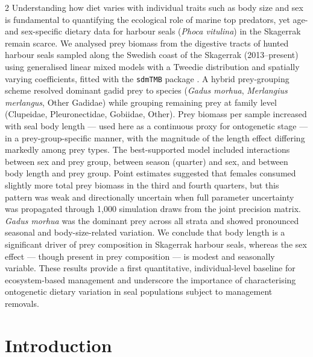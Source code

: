 \begin{spacing}{2}
Understanding how diet varies with individual traits such as body size and
sex is fundamental to quantifying the ecological role of marine top
predators, yet age- and sex-specific dietary data for harbour seals
(\textit{Phoca vitulina}) in the Skagerrak remain scarce. We analysed prey
biomass from the digestive tracts of hunted harbour seals sampled along the
Swedish coast of the Skagerrak (2013--present) using generalised linear
mixed models with a Tweedie distribution and spatially varying coefficients,
fitted with the \texttt{sdmTMB} package
\citep{Anderson2024}. A hybrid prey-grouping scheme resolved dominant gadid
prey to species (\textit{Gadus morhua}, \textit{Merlangius merlangus},
Other Gadidae) while grouping remaining prey at family level (Clupeidae,
Pleuronectidae, Gobiidae, Other). Prey biomass per sample increased with
seal body length --- used here as a continuous proxy for ontogenetic stage
--- in a prey-group-specific manner, with the magnitude of the length effect
differing markedly among prey types. The best-supported model included
interactions between sex and prey group, between season (quarter) and sex,
and between body length and prey group. Point estimates suggested that
females consumed slightly more total prey biomass in the third and fourth
quarters, but this pattern was weak and directionally uncertain when full
parameter uncertainty was propagated through 1,000 simulation draws from
the joint precision matrix. \textit{Gadus morhua} was the dominant prey
across all strata and showed pronounced seasonal and body-size-related
variation. We conclude that body length is a significant driver of prey
composition in Skagerrak harbour seals, whereas the sex effect --- though
present in prey composition --- is modest and seasonally variable. These
results provide a first quantitative, individual-level baseline for
ecosystem-based management and underscore the importance of characterising
ontogenetic dietary variation in seal populations subject to management
removals.

\clearpage

\section{Introduction}


\end{spacing}
